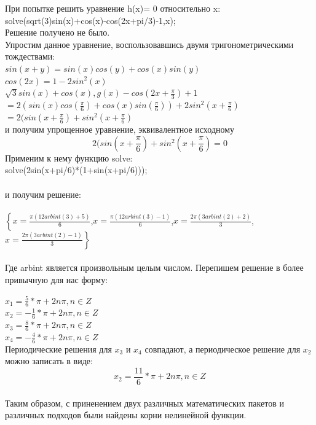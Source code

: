 \documentclass[russian,utf8,nocolumnxxxi,nocolumnxxxii]{eskdtext}
\begin{document}
При попытке решить уравнение h(x)= 0 относительно x:\\
solve(sqrt(3)sin(x)+cos(x)-cos(2x+pi/3)-1,x);\\
Решение получено не было.\\
Упростим данное уравнение, воспользовавшись двумя тригонометрическими тождествами:\\ $sin(x+y)=sin(x)cos(y)+cos(x)sin(y)$\\
$cos(2x)=1-2sin^2(x)$\\
$\sqrt{3}sin(x)+cos(x),g(x)-cos(2x+\frac{\pi}{3})+1$\\ $=2(sin(x)cos(\frac{\pi}{6})+cos(x)sin(\frac{\pi}{6}))+2sin^2(x+\frac{\pi}{6})$\\ $=2(sin(x+\frac{\pi}{6})+sin^2(x+\frac{\pi}{6})$\\
и получим упрощенное уравнение, эквивалентное исходному
$$2(sin(x+\frac{\pi}{6})+sin^2(x+\frac{\pi}{6})=0$$
Применим к нему функцию solve:\\
solve(2sin(x+pi/6)*(1+sin(x+pi/6)));\\
\\

и получим решение:\\
\\
$\left\{x=\frac{\pi(12arbint(3)+5)}{6}\right.$,$x=\frac{\pi(12arbint(3)-1)}{6}$,$x=\frac{2\pi(3arbint(2)+2)}{3}$,
$\left.x=\frac{2\pi(3arbint(2)-1)}{3}\right\}$\\
\\

Где arbint является произвольным целым числом. Перепишем решение в более привычную для нас форму:

$x_1=\frac{5}{6}*\pi+2n\pi,n\in Z$\\
$x_2=-\frac{1}{6}*\pi+2n\pi,n\in Z$\\
$x_3=\frac{8}{6}*\pi+2n\pi,n\in Z$\\
$x_4=-\frac{4}{6}*\pi+2n\pi,n\in Z$\\
Периодические решения для $x_3$ и $x_4$ совпадают, а периодическое решение для $x_2$ можно записать в виде:
$$x_2=\frac{11}{6}*\pi+2n\pi,n\in Z$$\\
Таким образом, с приненением двух различных математических пакетов и различных подходов были найдены корни нелинейной функции.
\end{document}
